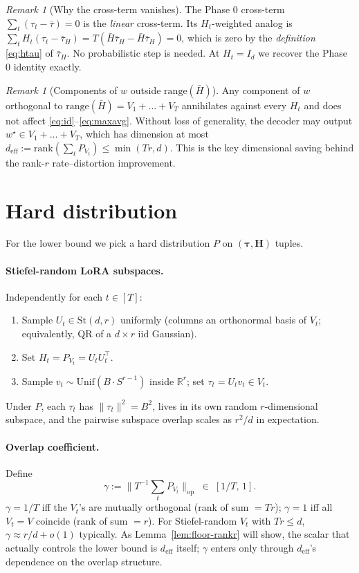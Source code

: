 \documentclass{article}
\theoremstyle{remark}
\newtheorem{remark}[theorem]{Remark}
\newcommand{\R}{\mathbb{R}}
\newcommand{\rank}{\mathrm{rank}}
\newcommand{\range}{\mathrm{range}}
\newcommand{\deff}{d_{\mathrm{eff}}}
\newcommand{\tauH}{\bar\tau_{H}}
\newcommand{\Hbar}{\bar H}
\newcommand{\Stiefel}{\mathrm{St}}
\begin{document}
\begin{remark}[Why the cross-term vanishes]
The Phase 0 cross-term $\sum_t(\tau_t-\bar\tau) = 0$ is the
\emph{linear} cross-term. Its $H_t$-weighted analog is
$\sum_t H_t(\tau_t-\tauH) = T(\Hbar\tauH - \Hbar\tauH) = 0$, which is
zero by the \emph{definition} \eqref{eq:htau} of $\tauH$. No
probabilistic step is needed. At $H_t = I_d$ we recover the Phase 0
identity exactly.
\end{remark}

\begin{remark}[Components of $w$ outside $\range(\Hbar)$]
\label{rem:project}
Any component of $w$ orthogonal to $\range(\Hbar) = V_1 + \dots + V_T$
annihilates against every $H_t$ and does not affect
\eqref{eq:id}--\eqref{eq:maxavg}. Without loss of generality, the
decoder may output $w^\star \in V_1 + \dots + V_T$, which has
dimension at most $\deff := \rank(\sum_t P_{V_t}) \leq \min(Tr, d)$.
This is the key dimensional saving behind the rank-$r$ rate--distortion
improvement.
\end{remark}

\section{Hard distribution}\label{sec:hard}

For the lower bound we pick a hard distribution $P$ on
$(\boldsymbol\tau, \boldsymbol H)$ tuples.

\paragraph{Stiefel-random LoRA subspaces.} Independently for each
$t\in[T]$:
\begin{enumerate}
  \item Sample $U_t \in \Stiefel(d, r)$ uniformly (columns an
  orthonormal basis of $V_t$; equivalently, QR of a $d\times r$
  iid Gaussian).
  \item Set $H_t = P_{V_t} = U_t U_t^\top$.
  \item Sample $v_t \sim \mathrm{Unif}(B \cdot S^{r-1})$ inside
  $\R^r$; set $\tau_t = U_t v_t \in V_t$.
\end{enumerate}
Under $P$, each $\tau_t$ has $\|\tau_t\|^2 = B^2$, lives in its own
random $r$-dimensional subspace, and the pairwise subspace overlap
scales as $r^2/d$ in expectation.

\paragraph{Overlap coefficient.} Define
\begin{equation}\label{eq:gamma}
  \gamma := \bigl\|T^{-1}\textstyle\sum_t P_{V_t}\bigr\|_{\mathrm{op}}
  \;\in\; [1/T,\, 1].
\end{equation}
$\gamma = 1/T$ iff the $V_t$'s are mutually orthogonal (rank of sum
$= Tr$); $\gamma = 1$ iff all $V_t = V$ coincide (rank of sum $= r$).
For Stiefel-random $V_t$ with $Tr \leq d$, $\gamma \approx r/d +
o(1)$ typically. As Lemma~\ref{lem:floor-rankr} will show, the scalar
that actually controls the lower bound is $\deff$ itself;
$\gamma$ enters only through $\deff$'s dependence on the overlap
structure.
\end{document}
